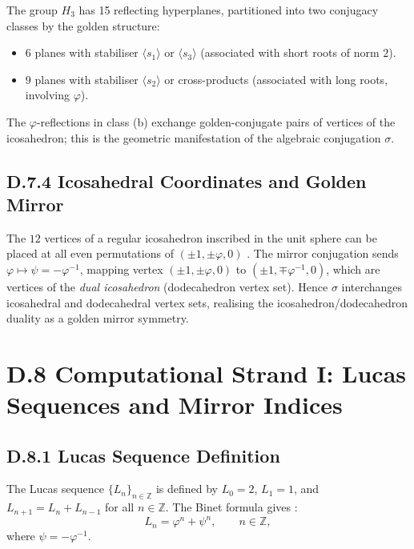 The group $H_3$ has 15 reflecting hyperplanes, partitioned into two conjugacy
classes by the golden structure:
\begin{itemize}
  \item $6$ planes with stabiliser $\langle s_1 \rangle$ or $\langle s_3 \rangle$
    (associated with short roots of norm $2$).
  \item $9$ planes with stabiliser $\langle s_2 \rangle$ or cross-products
    (associated with long roots, involving $\varphi$).
\end{itemize}
The $\varphi$-reflections in class (b) exchange golden-conjugate pairs of
vertices of the icosahedron; this is the geometric manifestation of the
algebraic conjugation $\sigma$.

\subsection*{D.7.4  Icosahedral Coordinates and Golden Mirror}

The $12$ vertices of a regular icosahedron inscribed in the unit sphere can be
placed at all even permutations of $(\pm 1, \pm\varphi, 0)$
\cite{coxeter_regular_polytopes}.
The mirror conjugation sends $\varphi \mapsto \psi = -\varphi^{-1}$, mapping
vertex $(\pm 1, \pm\varphi, 0)$ to $(\pm 1, \mp\varphi^{-1}, 0)$, which are
vertices of the \emph{dual icosahedron} (dodecahedron vertex set).
Hence $\sigma$ interchanges icosahedral and dodecahedral vertex sets,
realising the icosahedron/dodecahedron duality as a golden mirror symmetry.

\section*{D.8  Computational Strand I: Lucas Sequences and Mirror Indices}

\subsection*{D.8.1  Lucas Sequence Definition}

The Lucas sequence $\{L_n\}_{n\in\mathbb{Z}}$ is defined by
$L_0 = 2$, $L_1 = 1$, and $L_{n+1} = L_n + L_{n-1}$ for all $n\in\mathbb{Z}$.
The Binet formula gives \cite{vajda_fib_lucas}:
\[
  L_n = \varphi^n + \psi^n, \qquad n\in\mathbb{Z},
\]
where $\psi = -\varphi^{-1}$.

